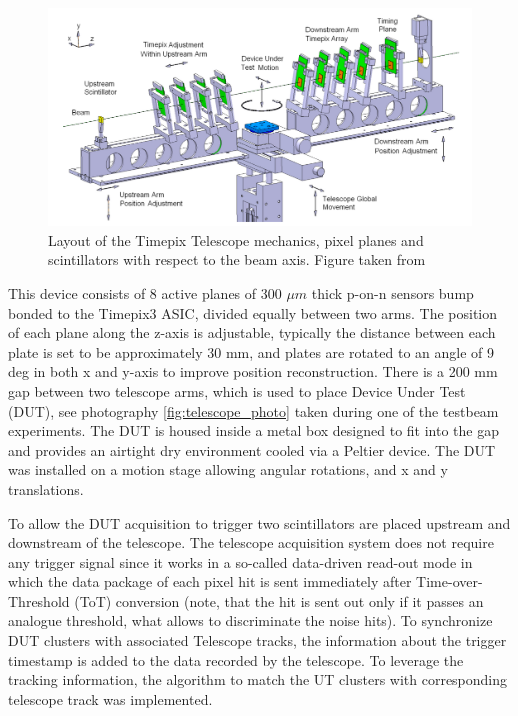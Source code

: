 \begin{figure}[!h]
\centering
\includegraphics{figures/telescope.png}
\caption{Layout of the Timepix Telescope mechanics, pixel planes and scintillators with respect to the beam axis. Figure taken from~\cite{telescope}}
\label{fig:telescope}
\end{figure}


This device consists of 8 active planes of 300 $\mu m$ thick p-on-n sensors bump bonded to the Timepix3 ASIC, divided equally between two arms. The position of each plane along the z-axis is adjustable, typically the distance between each plate is set to be approximately 30 mm, and plates are rotated to an angle of 9 deg in both x and y-axis to improve position reconstruction. There is a 200 mm gap between two telescope arms, which is used to place Device Under Test (DUT), see photography \ref{fig:telescope_photo} taken during one of the testbeam experiments. The DUT is housed inside a metal box designed to fit into the gap and provides an airtight dry environment cooled via a Peltier device. 
The DUT was installed on a motion stage allowing angular rotations, and x and y translations. 

To allow the DUT acquisition to trigger two scintillators are placed upstream and downstream of the telescope. The telescope acquisition system does not require any trigger signal since it works in a so-called data-driven read-out mode in which the data package of each pixel hit is sent immediately after Time-over-Threshold (ToT) conversion (note, that the hit is sent out only if it passes an analogue threshold, what allows to discriminate the noise hits). To synchronize DUT clusters with associated Telescope tracks, the information about the trigger timestamp is added to the data recorded by the telescope. To leverage the tracking information, the algorithm to match the UT clusters with corresponding telescope track was implemented. 


